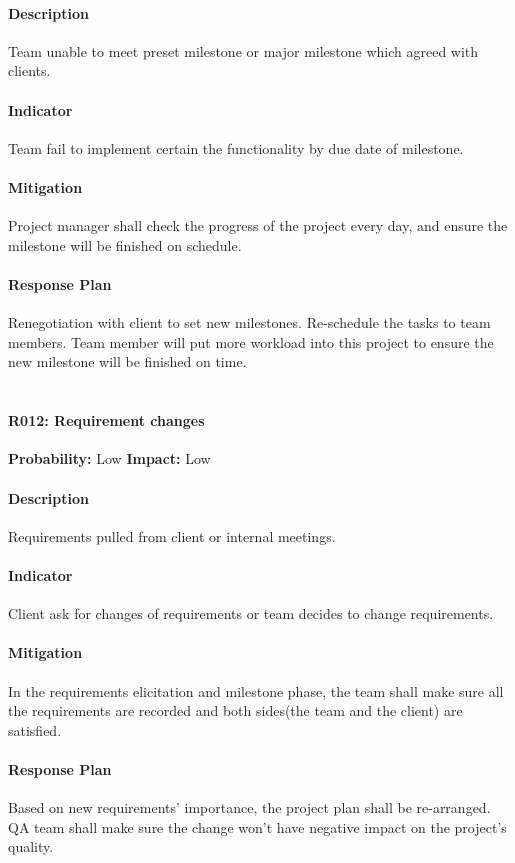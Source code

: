 \documentclass[11pt, a4paper]{report}
\begin{document}
	\paragraph{Description}Team unable to meet preset milestone or major milestone which agreed with clients.
	\paragraph{Indicator}Team fail to implement certain the functionality by due date of milestone. 
	\paragraph{Mitigation}Project manager shall check the progress of the project every day, and ensure the milestone will be finished on schedule. 
	\paragraph{Response Plan}Renegotiation with client to set new milestones. Re-schedule the tasks to team members. Team member will put more workload into this project to ensure the new milestone will be finished on time.\\\\

\pagebreak

	\paragraph{R012: Requirement changes} \hspace{1cm} \textbf{Probability: }Low\hspace{1cm}   \textbf{Impact: }Low
	\paragraph{Description}Requirements pulled from client or internal meetings.
	\paragraph{Indicator}Client ask for changes of requirements or team decides to change requirements.  
	\paragraph{Mitigation}In the requirements elicitation and milestone phase, the team shall make sure all the requirements are recorded and both sides(the team and the client) are satisfied.
	\paragraph{Response Plan}Based on new requirements' importance, the project plan shall be re-arranged. QA team shall make sure the change won't have negative impact on the project's quality. \\\\
\end{document}
